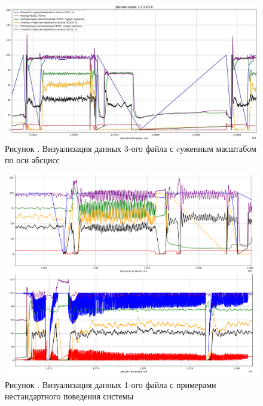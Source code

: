 {  \begin{figure}
    \centering
    \def\svgwidth{\textwidth}
    \includegraphics[scale=0.6]{images/data_3_visual.jpg}
    \caption*{\gostFont Рисунок \thechaptercntr .\theimagecntr \spc {--} Визуализация данных 3-ого файла с cуженным масштабом по оси абсцисс}
    \label{fig:Data3Visual}
  \end{figure} \addtocounter{imagecntr}{1}

  \begin{figure}
    \centering
    \def\svgwidth{\textwidth}
    \includegraphics[scale=0.5]{images/data_1_anomaly.png}
    \caption*{\gostFont Рисунок \thechaptercntr .\theimagecntr \spc {--} Визуализация данных 1-ого файла с примерами нестандартного поведения системы}
    \label{fig:Data1VisualAnomaly}
  \end{figure} \addtocounter{imagecntr}{1}

}
